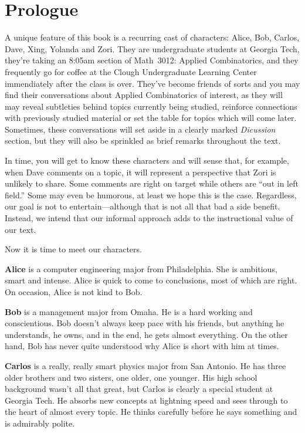 
\chapter{Prologue}\label{ch:prologue}

A unique feature of this book is a recurring cast of characters: Alice, Bob, Carlos,
Dave, Xing, Yolanda and Zori.  They are undergraduate
students at Georgia Tech, they're taking an 8:05am section
of Math~3012: Applied Combinatorics, and they frequently go for coffee
at the Clough Undergraduate Learning Center immendiately
after the class is over.  They've become friends of sorts and
you may find their conversations about Applied Combinatorics
of interest, as they will may reveal subtleties behind topics
currently being studied, reinforce connections with previously
studied material or set the table for topics which will come later.  
Sometimes, these conversations will set aside in a clearly
marked \textit{Dicussion} section, but they will also
be sprinkled as brief remarks throughout the text.

In time, you will get to know these characters and will sense that, 
for example, when Dave comments on a topic, it will represent a perspective 
that Zori is unlikely to share.  Some comments are right on target while 
others are ``out in left field.''  Some may even be humorous, at least
we hope this is the case.  Regardless, our goal is not to entertain---although
that is not all that bad a side benefit.  Instead, we intend that our 
informal approach adds to the instructional value of our text. 

Now it is time to meet our characters.

\medskip
\noindent
\textbf{Alice} is a computer engineering major from Philadelphia. She is
ambitious, smart and intense.  Alice is quick to come to conclusions, most 
of which are right.  On occasion, Alice is not kind to Bob.

\medskip
\noindent
\textbf{Bob} is a management major from Omaha. He is a hard working and conscientious.
Bob doesn't always keep pace with his friends, but anything he understands,
he owns, and in the end, he gets almost everything.  On the other hand,
Bob has never quite understood why Alice is short with him at times.

\medskip
\noindent
\textbf{Carlos} is a really, really smart physics major from San Antonio.  He
has three older brothers and two sisters, one older, one younger.  His high
school background wasn't all that great, but Carlos is clearly a special student
at Georgia Tech.  He absorbs new concepts at lightning speed and sees through to 
the heart of almost every topic.  He thinks carefully before he says something
and is admirably polite.

